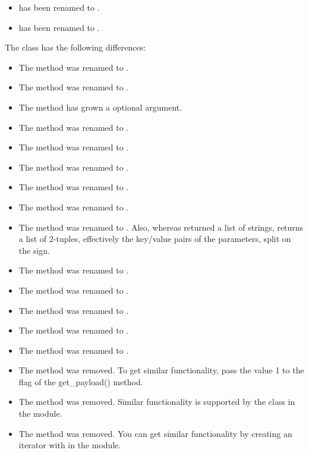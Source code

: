 \begin{itemize}
\item {} has been renamed to
      .
\item {} has been renamed to
      .
\end{itemize}

The  class has the following differences:

\begin{itemize}
\item The method  was renamed to .
\item The method  was renamed to
      .
\item The  method has grown a 
      optional argument.
\item The method  was renamed to .
\item The method  was renamed to .
\item The method  was renamed to .
\item The method was renamed to
      .
\item The method  was renamed to
      .
\item The method  was renamed to
      .
      Also, whereas  returned a list of strings,
       returns a list of 2-tuples, effectively
      the key/value pairs of the parameters, split on the \character{=}
      sign.
\item The method  was renamed to .
\item The method  was renamed to
      .
\item The method  was renamed to
      .
\item The method  was renamed to
      .
\item The method  was renamed to
      .
\item The method  was removed.  To get
      similar functionality, pass the value 1 to the  flag
      of the {get_payload()} method.
\item The method  was removed.  Similar
      functionality
      is supported by the  class in the
       module.
\item The method  was removed.  You can get
      similar functionality by creating an iterator with
       in the
       module.
\end{itemize}

